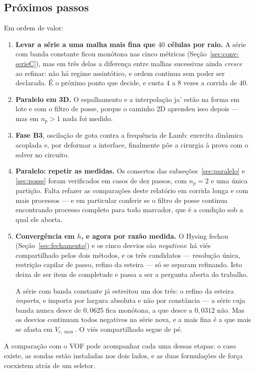 \subsection{Pr\'oximos passos}

Em ordem de valor:

\begin{enumerate}
  \item \textbf{Levar a s\'erie a uma malha mais fina que $40$ c\'elulas por
    raio.} A s\'erie com banda constante ficou mon\'otona nas cinco m\'etricas
    (Se\c{c}\~ao~\ref{sec:conv-serieC}), mas em tr\^es delas a diferen\c{c}a
    entre malhas sucessivas ainda \emph{cresce} ao refinar: n\~ao h\'a regime
    assint\'otico, e ordem continua sem poder ser declarada. \'E o pr\'oximo
    ponto que decide, e custa $4$ a $8$ vezes a corrida de $40$.
  \item \textbf{Paralelo em 3D.} O espalhamento e a interpola\c{c}\~ao ja'
    est\~ao na forma em lote e com o filtro de posse, porque o caminho 2D
    aprendeu isso depois --- mas em $n_p>1$ nada foi medido.
  \item \textbf{Fase B3}, oscila\c{c}\~ao de gota contra a frequ\^encia de Lamb:
    exercita din\^amica acoplada e, por deformar a interface, finalmente p\~oe a
    cirurgia \`a prova com o solver no circuito.
  \item \textbf{Paralelo: repetir as medidas.} Os consertos das
    subse\c{c}\~oes~\ref{sec:paralelo} e \ref{sec:posse} foram verificados em
    casos de dez passos, com $n_p=2$ e uma \'unica parti\c{c}\~ao. Falta refazer
    as compara\c{c}\~oes deste relat\'orio em corrida longa e com mais
    processos --- e em particular conferir se o filtro de posse continua
    encontrando processo completo para todo marcador, que \'e a condi\c{c}\~ao
    sob a qual ele aborta.
  \item \textbf{Converg\^encia em $h$, e agora por raz\~ao medida.} O Hysing
    fechou (Se\c{c}\~ao~\ref{sec:fechamento}) e os cinco desvios s\~ao
    \emph{negativos}: h\'a vi\'es compartilhado pelos dois m\'etodos, e os tr\^es
    candidatos --- resolu\c{c}\~ao \'unica, restri\c{c}\~ao capilar de passo,
    refino da esteira --- s\'o se separam refinando. Isto deixa de ser item de
    completude e passa a ser a pergunta aberta do trabalho.

    A s\'erie com banda constante j\'a estreitou um dos tr\^es: o refino da
    esteira \emph{importa}, e importa por largura absoluta e n\~ao por
    const\^ancia --- a s\'erie cuja banda nunca desce de $0{,}0625$ fica
    mon\'otona, a que desce a $0{,}0312$ n\~ao. Mas os desvios continuam todos
    negativos na s\'erie nova, e a mais fina \'e a que mais se afasta em
    $V_{c,\max}$. O vi\'es compartilhado segue de p\'e.
\end{enumerate}

A compara\c{c}\~ao com o VOF pode acompanhar cada uma dessas etapas: o caso
existe, as sondas est\~ao instaladas nos dois lados, e as duas formula\c{c}\~oes
de for\c{c}a coexistem atr\'as de um seletor.
